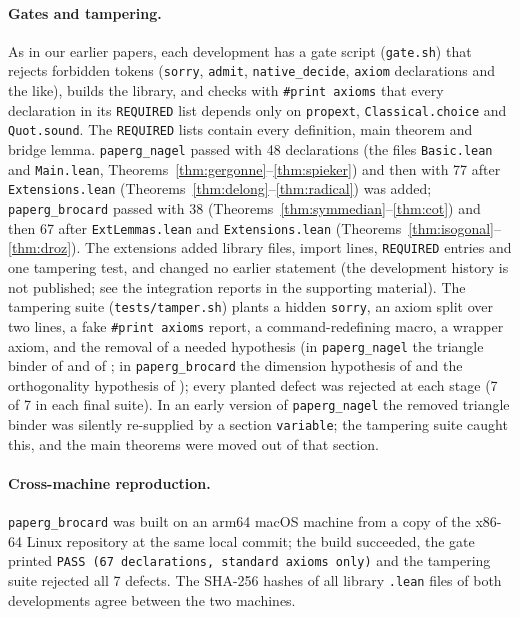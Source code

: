 \documentclass[11pt]{article}
\theoremstyle{definition}
\theoremstyle{remark}
\newcommand{\lean}[1]{\texttt{#1}}
\begin{document}
\paragraph{Gates and tampering.} As in our earlier papers, each development has a gate script
(\lean{gate.sh}) that rejects forbidden tokens (\lean{sorry}, \lean{admit}, \lean{native\_decide},
\lean{axiom} declarations and the like), builds the library, and checks with \lean{\#print axioms}
that every declaration in its \lean{REQUIRED} list depends only on \lean{propext},
\lean{Classical.choice} and \lean{Quot.sound}. The \lean{REQUIRED} lists contain every definition,
main theorem and bridge lemma. \lean{paperg\_nagel} passed with 48 declarations (the files
\lean{Basic.lean} and \lean{Main.lean}, Theorems~\ref{thm:gergonne}--\ref{thm:spieker}) and then with
77 after \lean{Extensions.lean} (Theorems~\ref{thm:delong}--\ref{thm:radical}) was added;
\lean{paperg\_brocard} passed with 38 (Theorems~\ref{thm:symmedian}--\ref{thm:cot}) and then 67
after \lean{ExtLemmas.lean} and \lean{Extensions.lean}
(Theorems~\ref{thm:isogonal}--\ref{thm:droz}). The extensions added library files, import lines, \lean{REQUIRED}
entries and one tampering test, and changed no earlier statement (the development history is not
published; see the integration reports in the supporting material). The tampering suite (\lean{tests/tamper.sh}) plants a hidden
\lean{sorry}, an axiom split over two lines, a fake \lean{\#print axioms} report, a
command-redefining macro, a wrapper axiom, and the removal of a needed hypothesis (in
\lean{paperg\_nagel} the triangle binder of  and of
; in \lean{paperg\_brocard} the dimension hypothesis of
 and the orthogonality hypothesis of
); every planted defect was rejected at each stage (7 of 7 in each final
suite). In an early version of \lean{paperg\_nagel} the removed triangle binder was silently
re-supplied by a section \lean{variable}; the tampering suite caught this, and the main theorems were
moved out of that section.

\paragraph{Cross-machine reproduction.} \lean{paperg\_brocard} was built on an arm64 macOS machine from
a copy of the x86-64 Linux repository at the same local commit; the build succeeded, the gate printed
\lean{PASS (67 declarations, standard axioms only)} and the tampering suite rejected all 7 defects. The
SHA-256 hashes of all library \lean{.lean} files of both developments agree between the two machines.
\end{document}
